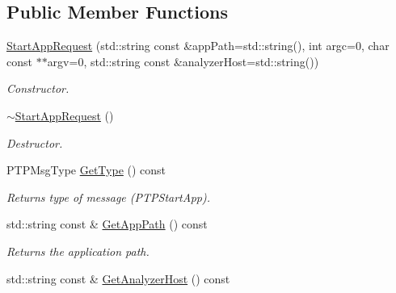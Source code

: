 \subsection*{Public Member Functions}
\begin{DoxyCompactItemize}
\item 
\hyperlink{class_common_1_1_start_app_request_a33de8cfc801853a72aaf0fb5e17fe85a}{Start\-App\-Request} (std\-::string const \&app\-Path=std\-::string(), int argc=0, char const $\ast$$\ast$argv=0, std\-::string const \&analyzer\-Host=std\-::string())
\begin{DoxyCompactList}\small\item\em Constructor. \end{DoxyCompactList}\item 
\hypertarget{class_common_1_1_start_app_request_a9acc893f77f51466d27352df7eae09b9}{\hyperlink{class_common_1_1_start_app_request_a9acc893f77f51466d27352df7eae09b9}{$\sim$\-Start\-App\-Request} ()}\label{class_common_1_1_start_app_request_a9acc893f77f51466d27352df7eae09b9}

\begin{DoxyCompactList}\small\item\em Destructor. \end{DoxyCompactList}\item 
\hypertarget{class_common_1_1_start_app_request_a0ba84b399107c3404b263c179df13f22}{P\-T\-P\-Msg\-Type \hyperlink{class_common_1_1_start_app_request_a0ba84b399107c3404b263c179df13f22}{Get\-Type} () const }\label{class_common_1_1_start_app_request_a0ba84b399107c3404b263c179df13f22}

\begin{DoxyCompactList}\small\item\em Returns type of message (P\-T\-P\-Start\-App). \end{DoxyCompactList}\item 
\hypertarget{class_common_1_1_start_app_request_ac9dc2abbcef17b407004a059da4b6d31}{std\-::string const \& \hyperlink{class_common_1_1_start_app_request_ac9dc2abbcef17b407004a059da4b6d31}{Get\-App\-Path} () const }\label{class_common_1_1_start_app_request_ac9dc2abbcef17b407004a059da4b6d31}

\begin{DoxyCompactList}\small\item\em Returns the application path. \end{DoxyCompactList}\item 
\hypertarget{class_common_1_1_start_app_request_a1498e398a6111c7d49d7b463a2708769}{std\-::string const \& \hyperlink{class_common_1_1_start_app_request_a1498e398a6111c7d49d7b463a2708769}{Get\-Analyzer\-Host} () const }\label{class_common_1_1_start_app_request_a1498e398a6111c7d49d7b463a2708769}


\end{DoxyCompactItemize}

